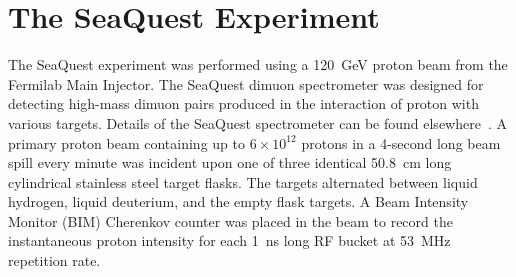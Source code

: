 \documentclass[reprint,aps,unsortedaddress,superscriptaddress,prd,floatfix,showpacs,linenumbers]{revtex4-2}
\begin{document}
 
\section{The SeaQuest Experiment}

The SeaQuest experiment was performed using a \SI{120}{\GeV} proton beam from the 
Fermilab Main Injector. The SeaQuest dimuon spectrometer was designed for
detecting high-mass dimuon pairs produced in the interaction of proton
with various targets. Details of the SeaQuest spectrometer can be found
elsewhere~\cite{aidala2019,dove2021,dove2023}. A primary proton beam containing 
up to $6 \times 10^{12}$ protons in a 4-second long beam spill every minute 
was incident upon one of three identical \SI{50.8}{\cm} long cylindrical 
stainless steel
target flasks. The targets alternated between liquid hydrogen, liquid deuterium,
and the empty flask targets. A Beam Intensity Monitor (BIM) Cherenkov counter 
was placed in the beam to record the instantaneous proton intensity for 
each \SI{1}{\ns} long RF bucket at \SI{53}{\MHz} repetition rate. 
\end{document}
